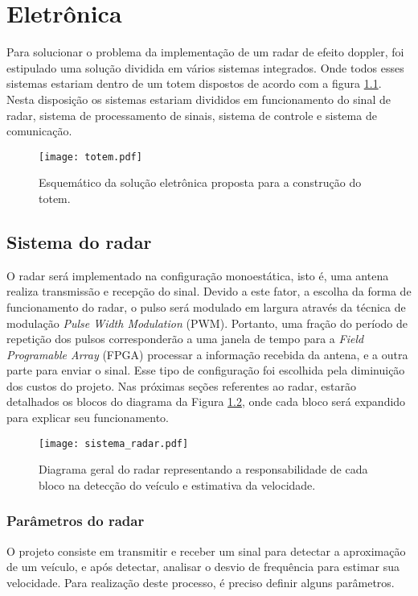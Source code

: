 
\chapter{Eletrônica}

Para solucionar o problema da implementação de um radar de efeito doppler, foi estipulado uma solução dividida em vários sistemas integrados. Onde todos esses sistemas estariam dentro de um totem dispostos de acordo com a figura \ref{esquematico1}. Nesta disposição os sistemas estariam divididos em funcionamento do sinal de radar, sistema de processamento de sinais, sistema de controle e sistema de comunicação.


\begin{figure}[H]
    \centering
    \texttt{[image: totem.pdf]}
    \caption{Esquemático da solução eletrônica proposta para a construção do totem. }
    \label{esquematico1}
\end{figure}

\section{Sistema do radar}

O radar será implementado na configuração monoestática, isto é, uma antena realiza transmissão e recepção do sinal. Devido a este fator, a escolha da forma de funcionamento do radar, o pulso será modulado em largura através da técnica de modulação \emph{Pulse Width Modulation} (PWM). Portanto, uma fração do período de repetição dos pulsos corresponderão a uma janela de tempo para a \emph{Field Programable Array} (FPGA) processar a informação recebida da antena, e a outra parte para enviar o sinal. Esse tipo de configuração foi escolhida pela diminuição dos custos do projeto.
Nas próximas seções referentes ao radar, estarão detalhados os blocos do diagrama da Figura \ref{processos_geral_radar}, onde cada bloco será expandido para explicar seu funcionamento.

\begin{figure}[H]
    \centering
    \texttt{[image: sistema\_radar.pdf]}
    \caption{Diagrama geral do radar representando a responsabilidade de cada bloco na detecção do veículo e estimativa da velocidade.}
    \label{processos_geral_radar}
\end{figure}

\subsection{Parâmetros do radar}
O projeto consiste em transmitir e receber um sinal para detectar a aproximação de um veículo, e após detectar, analisar o desvio de frequência para estimar sua velocidade. Para realização deste processo, é preciso definir alguns parâmetros.


